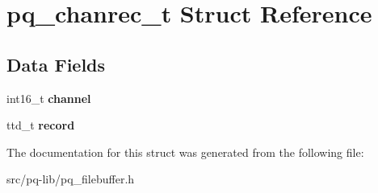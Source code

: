 \hypertarget{structpq__chanrec__t}{}\section{pq\+\_\+chanrec\+\_\+t Struct Reference}
\label{structpq__chanrec__t}
\subsection*{Data Fields}
\begin{DoxyCompactItemize}
\item 
\hypertarget{structpq__chanrec__t_ab88effb607bf72d4ecb9f58f8b6113fd}{}int16\+\_\+t {\bfseries channel}\label{structpq__chanrec__t_ab88effb607bf72d4ecb9f58f8b6113fd}

\item 
\hypertarget{structpq__chanrec__t_a7570c2d98bf21c1c9698b55919573f4c}{}ttd\+\_\+t {\bfseries record}\label{structpq__chanrec__t_a7570c2d98bf21c1c9698b55919573f4c}

\end{DoxyCompactItemize}


The documentation for this struct was generated from the following file\+:\begin{DoxyCompactItemize}
\item 
src/pq-\/lib/pq\+\_\+filebuffer.\+h\end{DoxyCompactItemize}

